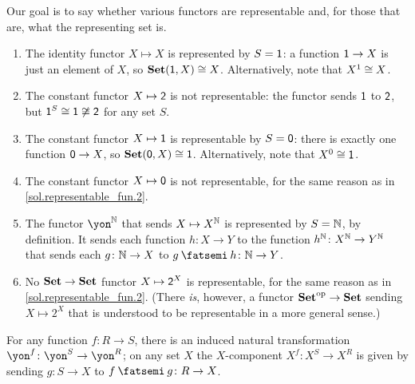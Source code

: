 \documentclass[Book-Poly]{subfiles}
\begin{document}
\begin{exercise}
\begin{solution}
Our goal is to say whether various functors are representable and, for those that are, what the representing set is.
\begin{enumerate}
	\item The identity functor $X\mapsto X$ is represented by $S=\textsf{1}$: a function $\textsf{1} \to X$ is just an element of $X$, so $\mathbf{Set}(\textsf{1},X) \cong X$.
	Alternatively, note that $X^1 \cong X$.
	\item \label{sol.representable_fun.2} The constant functor $X\mapsto\textsf{2}$ is not representable: the functor sends $\textsf{1}$ to $\textsf{2}$, but $\textsf{1}^S \cong \textsf{1} \not\cong \textsf{2}$ for any set $S$.
	\item The constant functor $X\mapsto\textsf{1}$ is representable by $S=\textsf{0}$: there is exactly one function $\textsf{0} \to X$, so $\mathbf{Set}(\textsf{0},X) \cong \textsf{1}$.
	Alternatively, note that $X^0 \cong \textsf{1}$.
	\item The constant functor $X\mapsto\textsf{0}$ is not representable, for the same reason as in \cref{sol.representable_fun.2}.
	\item The functor $\yon^\nn$ that sends $X\mapsto X^{\mathbb{N}}$ is represented by $S=\mathbb{N}$, by definition.
	It sends each function $h \colon X \to Y$ to the function $h^{\mathbb{N}} \colon X^{\mathbb{N}} \to Y^{\mathbb{N}}$ that sends each $g \colon \mathbb{N} \to X$ to $g \then h \colon \nn \to Y$.
	\item No $\mathbf{Set} \to \mathbf{Set}$ functor $X\mapsto \textsf{2}^X$ is representable, for the same reason as in \cref{sol.representable_fun.2}.
	(There \emph{is}, however, a functor $\mathbf{Set}^{\textnormal{op}} \to \mathbf{Set}$ sending $X \mapsto 2^X$ that is understood to be representable in a more general sense.)
\end{enumerate}
\end{solution}
\end{exercise}

\begin{proposition}\label{prop.representable_nt}
For any function $f\colon R\to S$, there is an induced natural transformation $\yon^f\colon\yon^S\to \yon^R$; on any set $X$ the $X$-component $X^f\colon X^S\to X^R$ is given by sending $g\colon S\to X$ to $f\then g\colon R\to X$.
\end{proposition}
\end{document}
